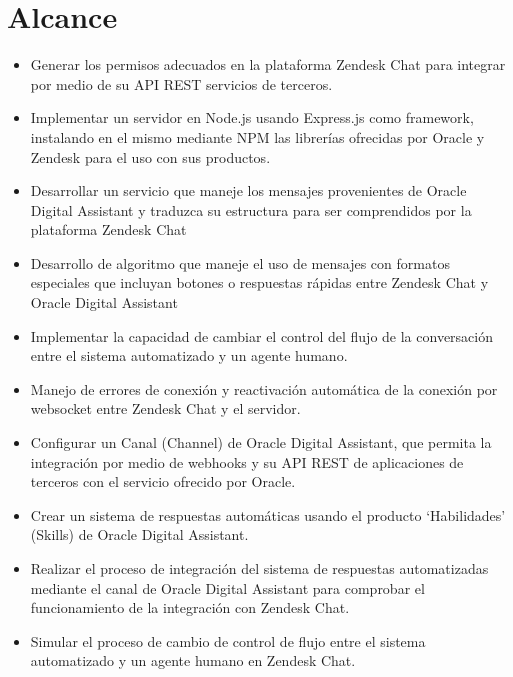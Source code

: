 \section{Alcance}
    \begin{itemize}
        \item Generar los permisos adecuados en la plataforma Zendesk Chat para integrar por medio de su API REST servicios de terceros.
        
        \item Implementar un servidor en Node.js usando Express.js como framework, instalando en el mismo mediante NPM las librerías ofrecidas por Oracle y Zendesk para el uso con sus productos.
        
        \item Desarrollar un servicio que maneje los mensajes provenientes de Oracle Digital Assistant y traduzca su estructura para ser comprendidos por la plataforma  Zendesk Chat
        
        \item Desarrollo de algoritmo que maneje el uso de mensajes con formatos especiales que incluyan botones o respuestas rápidas entre Zendesk Chat y Oracle Digital Assistant
        
        \item Implementar la capacidad de cambiar el control del flujo de la conversación entre el sistema automatizado y un agente humano.
        
        \item Manejo de errores de conexión y reactivación automática de la conexión por websocket entre Zendesk Chat y el servidor.
        
        \item Configurar un Canal (Channel) de Oracle Digital Assistant, que permita la integración por medio de webhooks y su API REST de aplicaciones de terceros con el servicio ofrecido por Oracle.
                
        \item Crear un sistema de respuestas automáticas usando el producto `Habilidades' (Skills) de Oracle Digital Assistant.
        
        \item Realizar el proceso de integración del sistema de respuestas automatizadas mediante el canal de Oracle Digital Assistant para comprobar el funcionamiento de la integración con Zendesk Chat.
        
        \item Simular el proceso de cambio de control de flujo entre el sistema automatizado y un agente humano en Zendesk Chat.
        
    \end{itemize}
